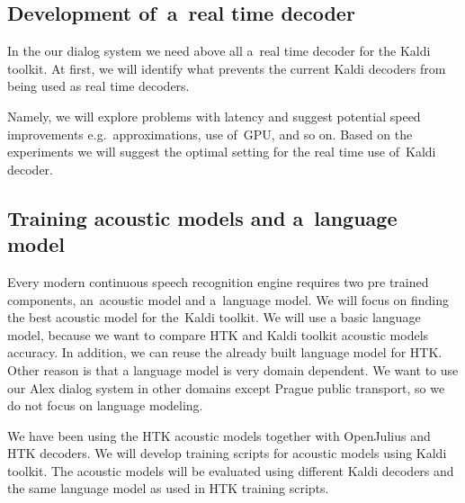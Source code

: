 


\subsection{Development of~a~real time decoder}
\label{sub:kaldi_rt_decoder}
In the our dialog system we need above all a~real time decoder for the Kaldi toolkit. At first, we will identify what prevents the current Kaldi decoders from being used as real time decoders. 

Namely, we will explore problems with latency and suggest potential speed improvements e.g.\ approximations, use of~\ac{GPU}, and so on. Based on the experiments we will suggest the optimal setting for the real time use of~Kaldi decoder.


\subsection{Training acoustic models and a~language model} 
\label{sub:training_kaldi_acoustic_models}
Every modern continuous speech recognition engine requires two pre trained components, an~acoustic model and a~language model. We will focus on finding the best acoustic model for the~Kaldi toolkit. We will use a basic language model, because we want to compare \ac{HTK} and Kaldi toolkit acoustic models accuracy.  In addition, we can reuse the already built language model for \ac{HTK}. Other reason is that a language model is very domain dependent. %
We want to use our Alex dialog system in other domains except Prague public transport, so we do not focus on language modeling. 

We have been using the \ac{HTK} acoustic models together with OpenJulius and \ac{HTK} decoders. We will develop training scripts for acoustic models using Kaldi toolkit. The acoustic models will be evaluated using different Kaldi decoders and the same language model as used in \ac{HTK} training scripts. 


